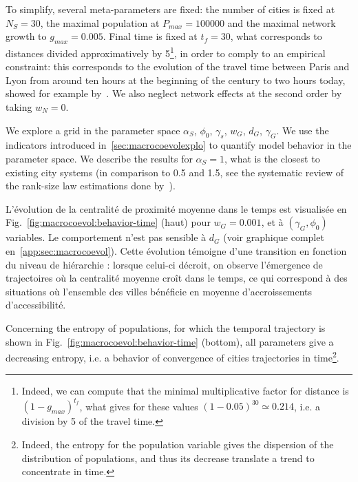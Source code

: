To simplify, several meta-parameters are fixed: the number of cities is fixed at $N_S = 30$, the maximal population at $P_{max} = 100000$ and the maximal network growth to $g_{max} = 0.005$. Final time is fixed at $t_f = 30$, what corresponds to distances divided approximatively by 5\footnote{Indeed, we can compute that the minimal multiplicative factor for distance is $(1 - g_{max})^{t_f}$, what gives for these values $(1 - 0.05)^{30} \simeq 0.214$, i.e. a division by 5 of the travel time.}, in order to comply to an empirical constraint: this corresponds to the evolution of the travel time between Paris and Lyon from around ten hours at the beginning of the century to two hours today, showed for example by~\cite{thevenin2013mapping}. We also neglect network effects at the second order by taking $w_N = 0$.


We explore a grid in the parameter space $\alpha_S$, $\phi_0$, $\gamma_s$, $w_G$, $d_G$, $\gamma_G$. We use the indicators introduced in~\ref{sec:macrocoevolexplo} to quantify model behavior in the parameter space. We describe the results for $\alpha_S = 1$, what is the closest to existing city systems (in comparison to 0.5 and 1.5, see the systematic review of the rank-size law estimations done by~\cite{10.1371/journal.pone.0183919}).



L'évolution de la centralité de proximité moyenne dans le temps est visualisée en Fig.~\ref{fig:macrocoevol:behavior-time} (haut) pour $w_G = 0.001$, et à $(\gamma_G,\phi_0)$ variables. Le comportement n'est pas sensible à $d_G$ (voir graphique complet en~\ref{app:sec:macrocoevol}). Cette évolution témoigne d'une transition en fonction du niveau de hiérarchie : lorsque celui-ci décroit, on observe l'émergence de trajectoires où la centralité moyenne croît dans le temps, ce qui correspond à des situations où l'ensemble des villes bénéficie en moyenne d'accroissements d'accessibilité.


Concerning the entropy of populations, for which the temporal trajectory is shown in Fig.~\ref{fig:macrocoevol:behavior-time} (bottom), all parameters give a decreasing entropy, i.e. a behavior of convergence of cities trajectories in time\footnote{Indeed, the entropy for the population variable gives the dispersion of the distribution of populations, and thus its decrease translate a trend to concentrate in time.}.


